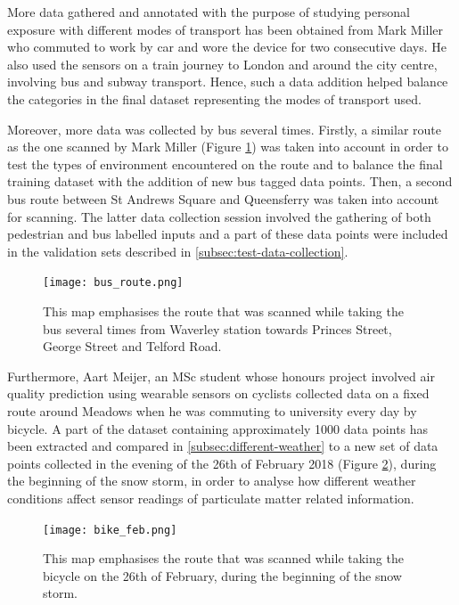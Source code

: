 \documentclass[bsc,frontabs,twoside,singlespacing,parskip,deptreport]{infthesis}     %
\begin{document}
More data gathered and annotated with the purpose of studying personal exposure with different modes of transport has been obtained from Mark Miller who commuted to work by car and wore the device for two consecutive days. He also used the sensors on a train journey to London and around the city centre, involving bus and subway transport. Hence, such a data addition helped balance the categories in the final dataset representing the modes of transport used.

Moreover, more data was collected by bus several times. Firstly, a similar route as the one scanned by Mark Miller (Figure \ref{fig:bus_route}) was taken into account in order to test the types of environment encountered on the route and to balance the final training dataset with the addition of new bus tagged data points. Then, a second bus route between St Andrews Square and Queensferry was taken into account for scanning. The latter data collection session involved the gathering of both pedestrian and bus labelled inputs and a part of these data points were included in the validation sets described in \ref{subsec:test-data-collection}.

\begin{figure}[h!]
  \center
  \texttt{[image: bus\_route.png]} 
  \caption{This map emphasises the route that was scanned while taking the bus several times from Waverley station towards Princes Street, George Street and Telford Road.}
  \label{fig:bus_route}
\end{figure}

Furthermore, Aart Meijer, an MSc student whose honours project involved air quality prediction using wearable sensors on cyclists collected data on a fixed route around Meadows when he was commuting to university every day by bicycle. A part of the dataset containing approximately 1000 data points has been extracted and compared in \ref{subsec:different-weather} to a new set of data points collected in the evening of the 26th of February 2018 (Figure \ref{fig:february-bike}), during the beginning of the snow storm, in order to analyse how different weather conditions affect sensor readings of particulate matter related information.

\begin{figure}[h!]
  \center
  \texttt{[image: bike\_feb.png]} 
  \caption{This map emphasises the route that was scanned while taking the bicycle on the 26th of February, during the beginning of the snow storm.}
  \label{fig:february-bike}
\end{figure}
\end{document}
